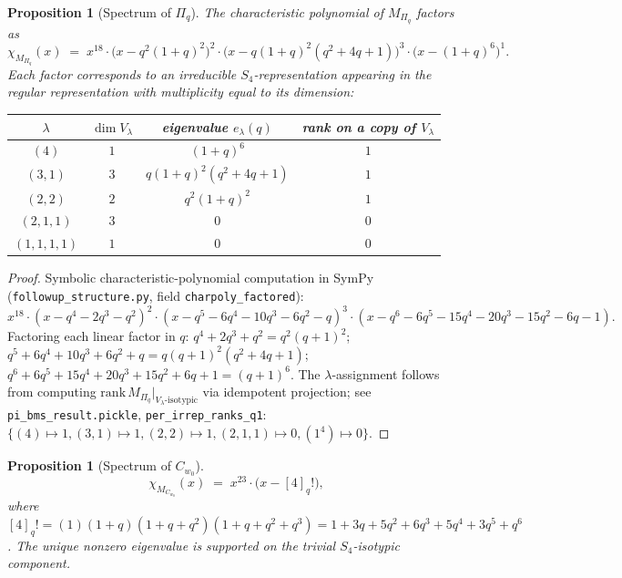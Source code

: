 \documentclass[11pt]{article}
\newtheorem{proposition}[theorem]{Proposition}
\theoremstyle{definition}
\begin{document}
\begin{proposition}[Spectrum of $\Pi_q$]\label{prop:spec-pi}
The characteristic polynomial of $M_{\Pi_q}$ factors as
\[
\chi_{M_{\Pi_q}}(x) \;=\; x^{18}\cdot
\bigl(x - q^2(1+q)^2\bigr)^{2}\cdot
\bigl(x - q(1+q)^2(q^2+4q+1)\bigr)^{3}\cdot
\bigl(x - (1+q)^6\bigr)^{1}.
\]
Each factor corresponds to an irreducible $S_4$-representation appearing in
the regular representation with multiplicity equal to its dimension:
\begin{center}
\begin{tabular}{c|c|c|c}
$\lambda$ & $\dim V_\lambda$ & eigenvalue $e_\lambda(q)$ & rank on a copy of $V_\lambda$\\\hline
$(4)$ & $1$ & $(1+q)^6$ & $1$\\
$(3,1)$ & $3$ & $q(1+q)^2(q^2+4q+1)$ & $1$\\
$(2,2)$ & $2$ & $q^2(1+q)^2$ & $1$\\
$(2,1,1)$ & $3$ & $0$ & $0$\\
$(1,1,1,1)$ & $1$ & $0$ & $0$
\end{tabular}
\end{center}
\end{proposition}

\begin{proof}
Symbolic characteristic-polynomial computation in SymPy
(\texttt{followup\_structure.py}, field \texttt{charpoly\_factored}):
\[
x^{18}\cdot(x-q^4-2q^3-q^2)^2\cdot(x-q^5-6q^4-10q^3-6q^2-q)^3\cdot(x-q^6-6q^5-15q^4-20q^3-15q^2-6q-1).
\]
Factoring each linear factor in $q$: $q^4+2q^3+q^2 = q^2(q+1)^2$;
$q^5+6q^4+10q^3+6q^2+q = q(q+1)^2(q^2+4q+1)$;
$q^6+6q^5+15q^4+20q^3+15q^2+6q+1 = (q+1)^6$. The $\lambda$-assignment
follows from computing $\mathrm{rank}\, M_{\Pi_q}|_{V_\lambda \text{-isotypic}}$
via idempotent projection; see \texttt{pi\_bms\_result.pickle},
\texttt{per\_irrep\_ranks\_q1}:
$\{(4)\mapsto 1, (3,1)\mapsto 1, (2,2)\mapsto 1, (2,1,1)\mapsto 0, (1^4)\mapsto 0\}$.
\end{proof}

\begin{proposition}[Spectrum of $C_{w_0}$]\label{prop:spec-c}
\[
\chi_{M_{C_{w_0}}}(x) \;=\; x^{23} \cdot \bigl(x - [4]_q!\bigr),
\]
where $[4]_q! = (1)(1+q)(1+q+q^2)(1+q+q^2+q^3) = 1 + 3q + 5q^2 + 6q^3 + 5q^4
+ 3q^5 + q^6$. The unique nonzero eigenvalue is supported on the
trivial $S_4$-isotypic component.
\end{proposition}
\end{document}
